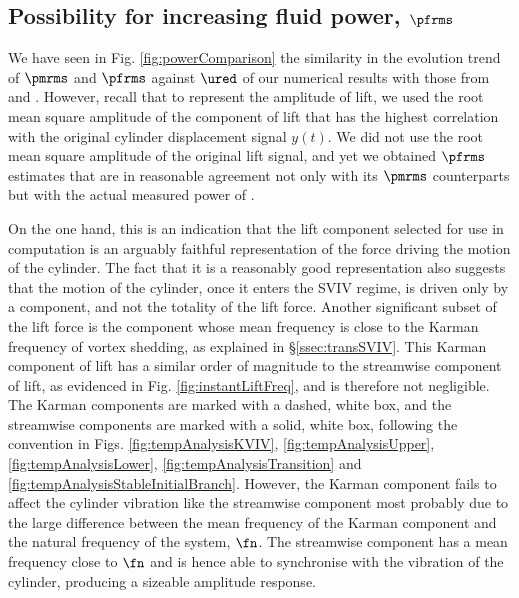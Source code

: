 \documentclass[a4paper,fleqn]{cas-sc}
\begin{document}
\subsection{Possibility for increasing fluid power, $\pfrms$} \label{ssec:possIncrease}
We have seen in Fig. \ref{fig:powerComparison} the similarity in the evolution trend of  $\pmrms$ and $\pfrms$ against $\ured$ of our numerical results with those from \citet{Nguyen2012} and \citet{Koide2013}. However, recall that to represent the amplitude of lift, we used the root mean square amplitude of the component of lift that has the highest correlation with the original cylinder displacement signal $y \left( t \right)$. We did not use the root mean square amplitude of the original lift signal, and yet we obtained $\pfrms$ estimates that are in reasonable agreement not only with its $\pmrms$ counterparts but with the actual measured power of \citet{Koide2013}.

On the one hand, this is an indication that the lift component selected for use in computation is an arguably faithful representation of the force driving the motion of the cylinder. The fact that it is a reasonably good representation also suggests that the motion of the cylinder, once it enters the SVIV regime, is driven only by a component, and not the totality of the lift force. Another significant subset of the lift force is the component whose mean frequency is close to the Karman frequency of vortex shedding, as explained in \S\ref{ssec:transSVIV}. This Karman component of lift has a similar order of magnitude to the streamwise component of lift, as evidenced in Fig. \ref{fig:instantLiftFreq}, and is therefore not negligible. The Karman components are marked with a dashed, white box, and the streamwise components are marked with a solid, white box, following the convention in Figs. \ref{fig:tempAnalysisKVIV}, \ref{fig:tempAnalysisUpper}, \ref{fig:tempAnalysisLower}, \ref{fig:tempAnalysisTransition} and \ref{fig:tempAnalysisStableInitialBranch}. However, the Karman component fails to affect the cylinder vibration like the streamwise component most probably due to the large difference between the mean frequency of the Karman component and the natural frequency of the system, $\fn$.  The streamwise component has a mean frequency close to $\fn$ and is hence able to synchronise with the vibration of the cylinder, producing a sizeable amplitude response.
\end{document}
